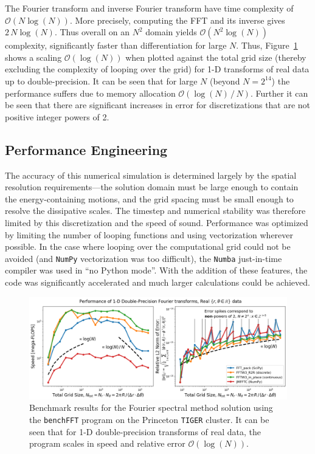 \documentclass{homework}
\begin{document}
\noindent
The Fourier transform and inverse Fourier transform have time complexity of $\mathcal{O}(N \log(N))$. More precisely, computing the FFT and its inverse gives $2 \, N \log(N)$. Thus overall on an $N^2$ domain yields $\mathcal{O}(N^2 \log(N))$ complexity, significantly faster than differentiation for large $N$. Thus, Figure~\ref{fig:Fourier} shows a scaling $\mathcal{O}(\log(N))$ when plotted against the total grid size (thereby excluding the complexity of looping over the grid) for 1-D transforms of real data up to double-precision. It can be seen that for large $N$ (beyond $N = 2^{14}$) the performance suffers due to memory allocation $\mathcal{O}(\log(N) \, / \, N)$. Further it can be seen that there are significant increases in error for discretizations that are not positive integer powers of 2.

\subsection{\textbf{Performance Engineering}} The accuracy of this numerical simulation is determined largely by the spatial resolution requirements---the solution domain must be large enough to contain the energy-containing motions, and the grid spacing must be small enough to resolve the dissipative scales. The timestep and numerical stability was therefore limited by this discretization and the speed of sound. Performance was optimized by limiting the number of looping functions and using vectorization wherever possible. In the case where looping over the computational grid could not be avoided (and \texttt{NumPy} vectorization was too difficult), the \texttt{Numba} just-in-time compiler was used in ``no Python mode''. With the addition of these features, the code was significantly accelerated and much larger calculations could be achieved.
\newpage
\begin{figure}[H]
    \centering
    \includegraphics[width = 1.02\textwidth]{media/FFT_performance.png}
    \caption{Benchmark results for the Fourier spectral method solution using the \texttt{benchFFT} program on the Princeton \texttt{TIGER} cluster. It can be seen that for 1-D double-precision transforms of real data, the program scales in speed and relative error $\mathcal{O}(\log(N))$.}
\label{fig:Fourier}\end{figure}
\end{document}
